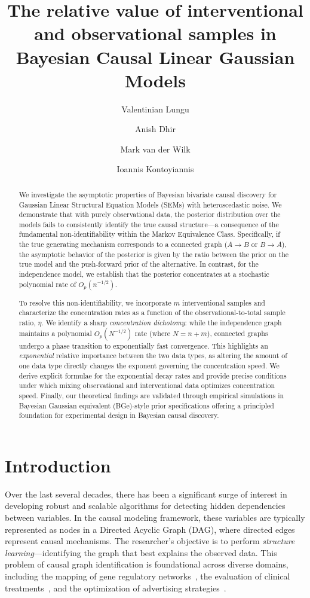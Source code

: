 \documentclass[accepted]{uai2026} %
\title{The relative value of interventional and observational samples in Bayesian Causal Linear Gaussian Models}
\author[1]{Valentinian Lungu}
\author[2]{Anish Dhir}
\author[3]{Mark van der Wilk}
\author[1]{Ioannis Kontoyiannis}
\affil[1]{Statistical Laboratory, Centre for Mathematical Sciences, University of Cambridge}
\affil[2]{Imperial College London}
\affil[3]{University of Oxford}
\theoremstyle{boldremark}
\begin{document}
\maketitle

\begin{abstract}
We investigate the asymptotic properties of Bayesian bivariate causal discovery for Gaussian Linear Structural Equation Models (SEMs) with heteroscedastic noise. We demonstrate that with purely observational data, the posterior distribution over the models fails to consistently identify the true causal structure—a consequence of the fundamental non-identifiability within the Markov Equivalence Class. Specifically, if the true generating mechanism corresponds to a connected graph ($A \rightarrow B$ or $B \rightarrow A$), the asymptotic behavior of the posterior is given by the ratio between the prior on the true model and the push-forward prior of the alternative. In contrast, for the independence model, we establish that the posterior concentrates at a stochastic polynomial rate of $O_p(n^{-1/2})$. 

To resolve this non-identifiability, we incorporate $m$ interventional samples and characterize the concentration rates as a function of the observational-to-total sample ratio, $\eta$. We identify a sharp \textit{concentration dichotomy}: while the independence graph maintains a polynomial $O_p(N^{-1/2})$ rate (where $N = n+m$), connected graphs undergo a phase transition to exponentially fast convergence. This highlights an \textit{exponential} relative importance between the two data types, as altering the amount of one data type directly changes the exponent governing the concentration speed. We derive explicit formulae for the exponential decay rates and provide precise conditions under which mixing observational and interventional data optimizes concentration speed. Finally, our theoretical findings are validated through empirical simulations in Bayesian Gaussian equivalent (BGe)-style prior specifications offering a principled foundation for experimental design in Bayesian causal discovery.

\end{abstract}

\section{Introduction}\label{sec:intro}

Over the last several decades, there has been a significant surge of interest in developing robust and scalable algorithms for detecting hidden dependencies between variables. In the causal modeling framework, these variables are typically represented as nodes in a Directed Acyclic Graph (DAG), where directed edges represent causal mechanisms. The researcher's objective is to perform \textit{structure learning}---identifying the graph that best explains the observed data. This problem of causal graph identification is foundational across diverse domains, including the mapping of gene regulatory networks~\citet{THOR}, the evaluation of clinical treatments~\citet{wu:24}, and the optimization of advertising strategies~\citet{VANDENBROECK2018470}.
\end{document}
